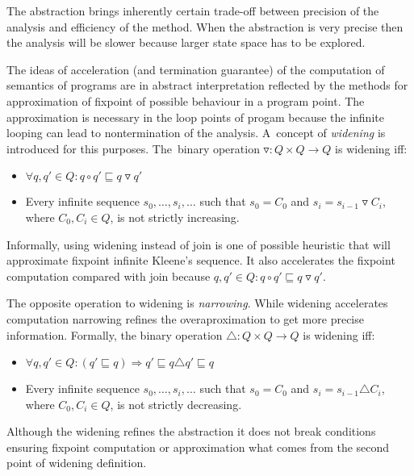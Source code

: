 \documentclass[a4paper, 12pt]{article}
\newcommand{\aord}[0]{\sqsubseteq}
\newcommand{\adom}[0]{Q}
\newcommand{\aitem}[0]{q}
\newcommand{\ajoin}[0]{\circ}
\newcommand{\wid}[0]{\triangledown}
\newcommand{\nar}[0]{\triangle}
\begin{document}
The abstraction brings inherently certain trade-off between
precision of the analysis and efficiency of the method.
When the abstraction is very precise then the analysis
will be slower because larger state space has to be explored.

The ideas of acceleration (and termination guarantee) of the computation of semantics
of programs are in abstract interpretation reflected by
the methods for approximation of fixpoint of possible
behaviour in a program point.
The approximation is necessary in the loop points of
progam because the infinite looping can lead to nontermination
of the analysis.
A~concept of \emph{widening} is introduced for this purposes.
The~binary operation $\wid: \adom \times \adom \rightarrow \adom$ is widening iff:
\begin{itemize}
	\item $\forall \aitem, \aitem' \in \adom: \aitem \ajoin \aitem' \aord \aitem \wid \aitem'$
	\item Every infinite sequence $s_0, \ldots, s_i, \ldots$ such that
		$s_0 = C_0$ and $s_i = s_{i-1} \wid C_i$, where $C_0, C_i \in \adom$,
		is not strictly increasing.
\end{itemize}

Informally, using widening instead of join is one of possible heuristic
that will approximate fixpoint infinite Kleene's sequence.
It also accelerates the fixpoint computation compared with join because
$\aitem, \aitem' \in \adom: \aitem \ajoin \aitem' \aord \aitem \wid \aitem'$.

The opposite operation to widening is \emph{narrowing}.
While widening accelerates computation narrowing
refines the overaproximation to get more precise information.
Formally, the binary operation $\nar: \adom \times \adom \rightarrow \adom$
is widening iff:
\begin{itemize}
	\item $\forall \aitem, \aitem' \in \adom: (\aitem' \aord \aitem) \Rightarrow \aitem' \aord \aitem \nar \aitem' \aord \aitem$
	\item Every infinite sequence $s_0, \ldots, s_i, \ldots$ such that
		$s_0 = C_0$ and $s_i = s_{i-1} \nar C_i$, where $C_0, C_i \in \adom$,
		is not strictly decreasing.
\end{itemize}

Although the widening refines the abstraction it does not
break conditions ensuring fixpoint computation or approximation
what comes from the second point of widening definition.
\end{document}
